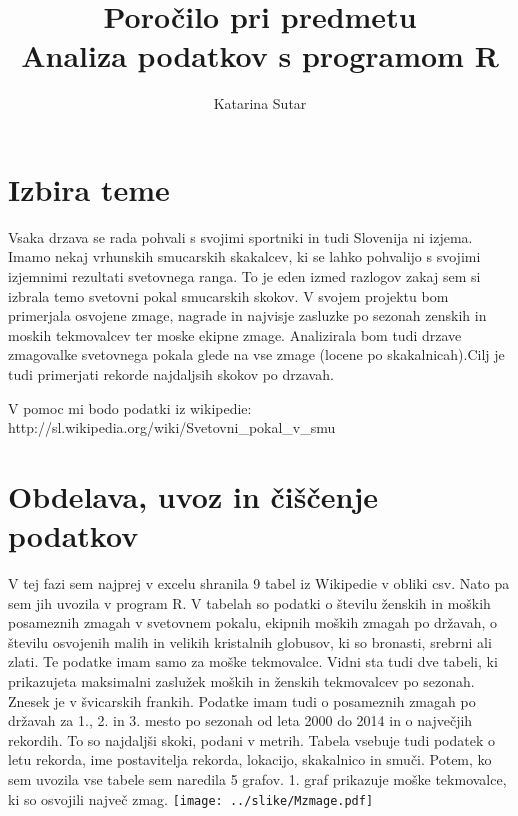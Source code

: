 \documentclass[11pt,a4paper]{article}
\begin{document}
\title{Poročilo pri predmetu \\
Analiza podatkov s programom R}
\author{Katarina Sutar}
\maketitle

\section{Izbira teme}

Vsaka drzava se rada pohvali s svojimi sportniki in tudi Slovenija ni izjema. Imamo nekaj vrhunskih smucarskih skakalcev, ki se lahko pohvalijo s svojimi izjemnimi rezultati svetovnega ranga. To je eden izmed razlogov zakaj sem si izbrala temo svetovni pokal smucarskih skokov. V svojem projektu bom primerjala osvojene zmage, nagrade in najvisje zasluzke po sezonah zenskih in moskih tekmovalcev ter moske ekipne zmage. Analizirala bom tudi drzave zmagovalke svetovnega pokala glede na vse zmage (locene po skakalnicah).Cilj je tudi primerjati rekorde najdaljsih skokov po drzavah.

V pomoc mi bodo podatki iz wikipedie: http://sl.wikipedia.org/wiki/Svetovni_pokal_v_smu%


\section{Obdelava, uvoz in čiščenje podatkov}

V tej fazi sem najprej v excelu shranila 9 tabel iz Wikipedie v obliki csv. Nato pa sem jih uvozila v program R. V tabelah so podatki o številu ženskih in moških posameznih zmagah v svetovnem pokalu, ekipnih moških zmagah po državah, o številu osvojenih malih in velikih kristalnih globusov, ki so bronasti, srebrni ali zlati. Te podatke imam samo za moške tekmovalce. Vidni sta tudi dve tabeli, ki prikazujeta maksimalni zaslužek moških in ženskih tekmovalcev po sezonah. Znesek je v švicarskih frankih. Podatke imam tudi o posameznih zmagah po državah za 1., 2. in 3. mesto po sezonah od leta 2000 do 2014 in o največjih rekordih. To so najdaljši skoki, podani v metrih. Tabela vsebuje tudi podatek o letu rekorda, ime postavitelja rekorda, lokacijo, skakalnico in smuči. Potem, ko sem uvozila vse tabele sem naredila 5 grafov. 
1. graf prikazuje moške tekmovalce, ki so osvojili največ zmag.
\texttt{[image: ../slike/Mzmage.pdf]}
\end{document}
